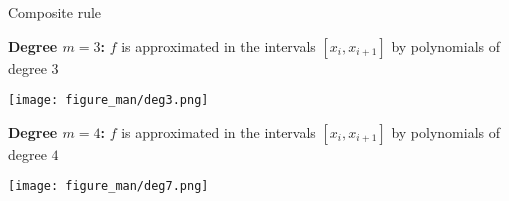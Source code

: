 \documentclass[11pt,compress,t,notes=noshow, xcolor=table]{beamer}
\begin{document}
\begin{vbframe}{Composite rule}
\framebreak

\textbf{Degree $m = 3$:} $f$ is approximated in the intervals $[x_i, x_{i + 1}]$ by polynomials of degree $3$

\begin{center}
\texttt{[image: figure\_man/deg3.png]}
\end{center}


\framebreak

\textbf{Degree $m = 4$:} $f$ is approximated in the intervals $[x_i, x_{i + 1}]$ by polynomials of degree $4$

\begin{center}
\texttt{[image: figure\_man/deg7.png]}
\end{center}


%
%

\end{vbframe}














\end{document}
